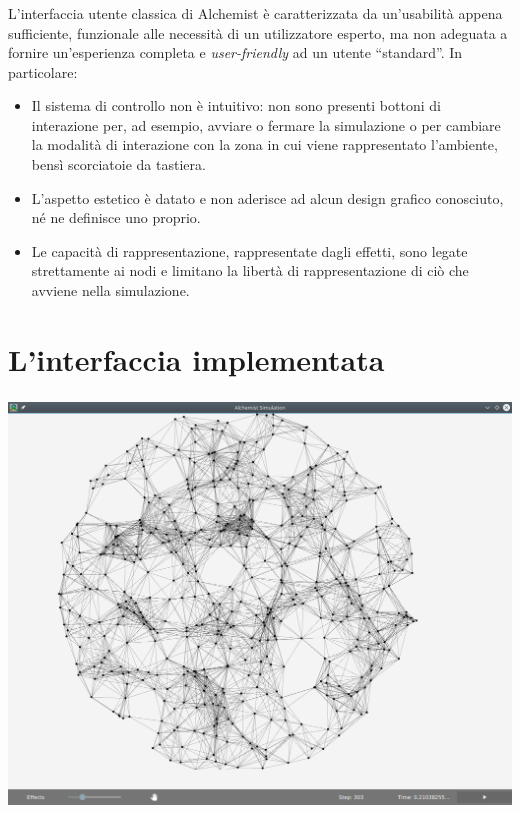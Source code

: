 \documentclass[%
]{beamer}
\newcommand{\engEmph}[1] {\emph{\foreignlanguage{english}#1}}
\begin{document}
    \begin{frame}
        \frametitle{\insertsection}

        L'interfaccia utente classica di Alchemist è caratterizzata da un'usabilità appena sufficiente, funzionale alle necessità di un utilizzatore esperto, ma non adeguata a fornire un'esperienza completa e \engEmph{user-friendly} ad un utente ``standard''.
        In particolare:

        \begin{itemize}[<+(1)->]
          \item
              Il sistema di controllo non è intuitivo: non sono presenti bottoni di interazione per, ad esempio, avviare o fermare la simulazione o per cambiare la modalità di interazione con la zona in cui viene rappresentato l'ambiente, bensì scorciatoie da tastiera.
          \item
              L'aspetto estetico è datato e non aderisce ad alcun design grafico conosciuto, né ne definisce uno proprio.
          \item
              Le capacità di rappresentazione, rappresentate dagli effetti, sono legate strettamente ai nodi e limitano la libertà di rappresentazione di ciò che avviene nella simulazione.
        \end{itemize}
    \end{frame}

    \section{L'interfaccia implementata}\label{sec:new}

    \begin{frame}
        \frametitle{\insertsection}
        \centering
        \includegraphics[scale=0.27]{img/new/window_all}
    \end{frame}
\end{document}
